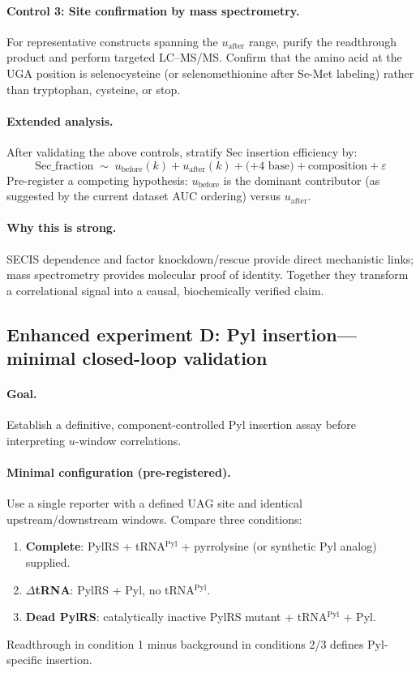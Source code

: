 \paragraph{Control 3: Site confirmation by mass spectrometry.}
For representative constructs spanning the $u_{\mathrm{after}}$ range, purify the readthrough product and perform targeted LC--MS/MS.
Confirm that the amino acid at the $\mathrm{UGA}$ position is selenocysteine (or selenomethionine after Se-Met labeling) rather than tryptophan, cysteine, or stop.

\paragraph{Extended analysis.}
After validating the above controls, stratify Sec insertion efficiency by:
\[
\text{Sec\_fraction} \;\sim\; u_{\mathrm{before}}(k) + u_{\mathrm{after}}(k) + \text{(+4 base)} + \text{composition} + \varepsilon
\]
Pre-register a competing hypothesis: $u_{\mathrm{before}}$ is the dominant contributor (as suggested by the current dataset AUC ordering) versus $u_{\mathrm{after}}$.

\paragraph{Why this is strong.}
SECIS dependence and factor knockdown/rescue provide direct mechanistic links; mass spectrometry provides molecular proof of identity.
Together they transform a correlational signal into a causal, biochemically verified claim.

\subsection{Enhanced experiment D: Pyl insertion---minimal closed-loop validation}
\label{app:bio_exp_d_pyl_mechanistic}

\paragraph{Goal.}
Establish a definitive, component-controlled Pyl insertion assay before interpreting $u$-window correlations.

\paragraph{Minimal configuration (pre-registered).}
Use a single reporter with a defined $\mathrm{UAG}$ site and identical upstream/downstream windows.
Compare three conditions:
\begin{enumerate}
\item \textbf{Complete}: PylRS + tRNA$^{\mathrm{Pyl}}$ + pyrrolysine (or synthetic Pyl analog) supplied.
\item \textbf{$\Delta$tRNA}: PylRS + Pyl, no tRNA$^{\mathrm{Pyl}}$.
\item \textbf{Dead PylRS}: catalytically inactive PylRS mutant + tRNA$^{\mathrm{Pyl}}$ + Pyl.
\end{enumerate}
Readthrough in condition 1 minus background in conditions 2/3 defines Pyl-specific insertion.

